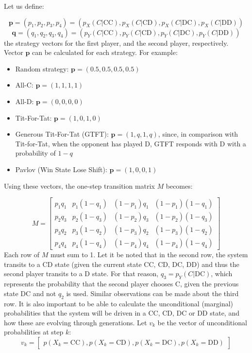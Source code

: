 \documentclass[12pt]{article}
\begin{document}
Let us define:

\[
\mathbf{p} = (p_1, p_2, p_3, p_4) = (p_X(C|\text{CC}), p_X(C|\text{CD}), p_X(C|\text{DC}), p_X(C|\text{DD}))
\]
\[
\mathbf{q} = (q_1, q_2, q_3, q_4) = (p_Y(C|\text{CC}), p_Y(C|\text{CD}), p_Y(C|\text{DC}), p_Y(C|\text{DD}))
\]
the strategy vectors for the first player, and the second player, respectively. Vector $\mathbf{p}$ can be calculated for each strategy.
For example:
\begin{itemize}
  \item Random strategy: \( \mathbf{p} = (0.5, 0.5, 0.5, 0.5) \)
  \item All-C: \( \mathbf{p} = (1, 1, 1, 1) \)
  \item All-D: \( \mathbf{p} = (0, 0, 0, 0) \)
  \item Tit-For-Tat: \( \mathbf{p} = (1, 0, 1, 0) \)
  \item Generous Tit-For-Tat (GTFT): \( \mathbf{p} = (1, q, 1, q) \), since, in comparison with Tit-for-Tat, when the opponent has played D, GTFT responds with D with a probability of $1-q$
  \item Pavlov (Win State Lose Shift): \( \mathbf{p} = (1, 0, 0, 1) \)
\end{itemize}

Using these vectors, the one-step transition matrix \( M \) becomes:

\[
M =
\begin{bmatrix}
p_1 q_1 & p_1 (1 - q_1) & (1 - p_1) q_1 & (1 - p_1)(1 - q_1) \\
p_2 q_3 & p_2 (1 - q_3) & (1 - p_2) q_3 & (1 - p_2)(1 - q_3) \\
p_3 q_2 & p_3 (1 - q_2) & (1 - p_3) q_2 & (1 - p_3)(1 - q_2) \\
p_4 q_4 & p_4 (1 - q_4) & (1 - p_4) q_4 & (1 - p_4)(1 - q_4)
\end{bmatrix}
\]
Each row of \( M \) must sum to 1. Let it be noted that in the second row, the system transits to a CD state (given the current state CC, CD, DC, DD) and thus the second player transits to a D state. For that reason, \(
q_3 = p_Y(C|\text{DC}) 
\), which represents the probability that the second player chooses C, given the previous state DC and not  \(
q_2 
\)  is used. Similar observations can be made about the third row.
It is also important to be able to calculate the unconditional (marginal) probabilities that the system will be driven in a CC, CD, DC or DD state, and how these are evolving through generations. 
Let \( v_k \) be the vector of unconditional probabilities at step \( k \):
\[
v_k = \begin{bmatrix}
p(X_k = \text{CC}) ,  p(X_k = \text{CD}) ,  p(X_k = \text{DC}) ,  p(X_k = \text{DD})
\end{bmatrix}
\]
\end{document}
